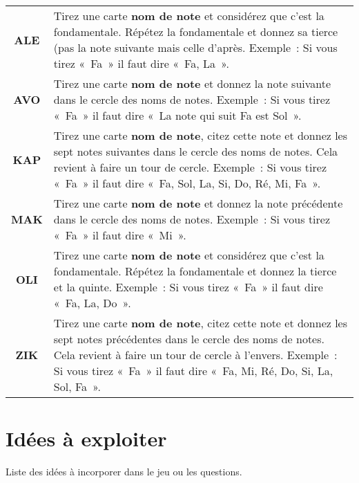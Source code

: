 \documentclass[11pt]{article}
\newcommand{\carte}[1]
{\textbf{#1}}
\newcommand{\QST}[1]
{\textbf{#1}}
\newcommand{\AVO}[0]
{Tirez une carte \carte{nom de note} et donnez la note suivante dans le cercle
des noms de notes. Exemple : Si vous tirez « Fa » il faut dire « La note qui
suit Fa est Sol ».}
\begin{document}
\begin{tabular}{ c p{12cm} }
    \QST{ALE} & Tirez une carte \carte{nom de note} et considérez que c’est la
                fondamentale. Répétez la fondamentale et donnez sa tierce (pas
                la note suivante mais celle d’après. Exemple : Si vous tirez
                « Fa » il faut dire « Fa, La ». \\
    \QST{AVO} & \AVO \\
    \QST{KAP} & Tirez une carte \carte{nom de note}, citez cette note et donnez
                les sept notes suivantes dans le cercle des noms de notes.
                Cela revient à faire un tour de cercle.
                Exemple : Si vous tirez « Fa » il faut dire « Fa, Sol, La, Si,
                Do, Ré, Mi, Fa ». \\
    \QST{MAK} & Tirez une carte \carte{nom de note} et donnez la note
                précédente dans le cercle des noms de notes. Exemple : Si vous
                tirez « Fa » il faut dire « Mi ». \\
    \QST{OLI} & Tirez une carte \carte{nom de note} et considérez que c’est la
                fondamentale. Répétez la fondamentale et donnez la tierce et
                la quinte. Exemple : Si vous tirez « Fa » il faut dire « Fa,
                La, Do ». \\
    \QST{ZIK} & Tirez une carte \carte{nom de note}, citez cette note et donnez
                les sept notes précédentes dans le cercle des noms de notes.
                Cela revient à faire un tour de cercle à l’envers.
                Exemple : Si vous tirez « Fa » il faut dire « Fa, Mi, Ré, Do,
                Si, La, Sol, Fa ».
\end{tabular}

\section{Idées à exploiter}

Liste des idées à incorporer dans le jeu ou les questions.
\end{document}
